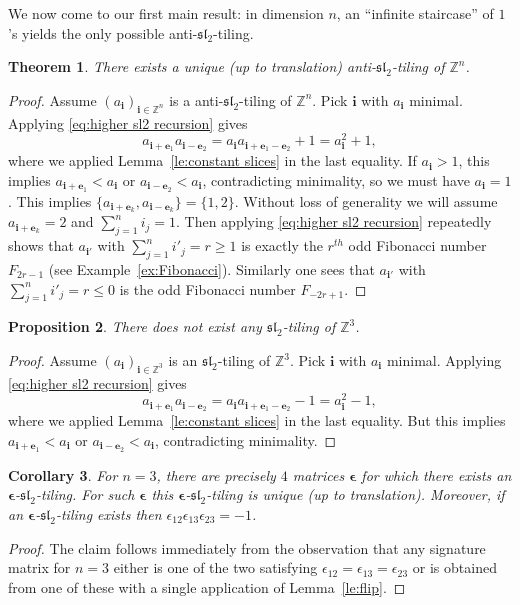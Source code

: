 \documentclass{amsart}
\newtheorem{theorem}{Theorem}
\newtheorem{corollary}[theorem]{Corollary}
\newtheorem{proposition}[theorem]{Proposition}
\newcommand{\bepsilon}{\boldsymbol{\epsilon}}
\newcommand{\be}{\boldsymbol{e}}
\newcommand{\bi}{\boldsymbol{i}}
\newcommand{\fsl}{\mathfrak{sl}}
\newcommand{\ZZ}{\mathbb{Z}}
\begin{document}
  We now come to our first main result: in dimension $n$, an ``infinite staircase'' of $1$'s yields the only possible anti-$\fsl_2$-tiling.

  \begin{theorem}
    There exists a unique (up to translation) anti-$\fsl_2$-tiling of $\ZZ^n$.
  \end{theorem}
  \begin{proof}
    Assume $(a_{\bi})_{\bi\in\ZZ^n}$ is a anti-$\fsl_2$-tiling of $\ZZ^n$.  
    Pick $\bi$ with $a_{\bi}$ minimal.  
    Applying \eqref{eq:higher sl2 recursion} gives
    \[
      a_{\bi+\be_1}a_{\bi-\be_2}=a_{\bi}a_{\bi+\be_1-\be_2}+1=a_{\bi}^2+1,
    \]
    where we applied Lemma~\ref{le:constant slices} in the last equality.
    If $a_{\bi}>1$, this implies $a_{\bi+\be_1}<a_{\bi}$ or $a_{\bi-\be_2}<a_{\bi}$, contradicting minimality, so we must have $a_{\bi}=1$.
    This implies $\{a_{\bi+\be_k},a_{\bi-\be_k}\}=\{1,2\}$.
    Without loss of generality we will assume $a_{\bi+\be_k}=2$ and $\sum_{j=1}^n i_j=1$.
    Then applying \eqref{eq:higher sl2 recursion} repeatedly shows that $a_{\bi'}$ with $\sum_{j=1}^n i'_j=r\ge1$ is exactly the $r^{th}$ odd Fibonacci number $F_{2r-1}$ (see Example~\ref{ex:Fibonacci}).
    Similarly one sees that $a_{\bi'}$ with $\sum_{j=1}^n i'_j =r\le0$ is the odd Fibonacci number $F_{-2r+1}$.
  \end{proof}

  \begin{proposition}\label{pr:nonexistence}
    There does not exist any $\fsl_2$-tiling of $\ZZ^3$.
  \end{proposition}
  \begin{proof}
    Assume $(a_{\bi})_{\bi\in\ZZ^3}$ is an $\fsl_2$-tiling of $\ZZ^3$.
    Pick $\bi$ with $a_{\bi}$ minimal.
    Applying \eqref{eq:higher sl2 recursion} gives
    \[
      a_{\bi+\be_1}a_{\bi-\be_2}=a_{\bi}a_{\bi+\be_1-\be_2}-1=a_{\bi}^2-1,
    \]
    where we applied Lemma~\ref{le:constant slices} in the last equality.
    But this implies $a_{\bi+\be_1}<a_{\bi}$ or $a_{\bi-\be_2}<a_{\bi}$, contradicting minimality.
  \end{proof}

  \begin{corollary}\label{co:n=3}
    For $n=3$, there are precisely $4$ matrices $\bepsilon$ for which there exists an $\bepsilon$-$\fsl_2$-tiling. 
    For such $\bepsilon$ this $\bepsilon$-$\fsl_2$-tiling is unique (up to translation).
    Moreover, if an $\bepsilon$-$\fsl_2$-tiling exists then $\epsilon_{12}\epsilon_{13}\epsilon_{23}=-1$.
  \end{corollary}
  \begin{proof}
    The claim follows immediately from the observation that any signature matrix for $n=3$ either is one of the two satisfying $\epsilon_{12}=\epsilon_{13}=\epsilon_{23}$ or is obtained from one of these with a single application of Lemma~\ref{le:flip}.
  \end{proof}
\end{document}
